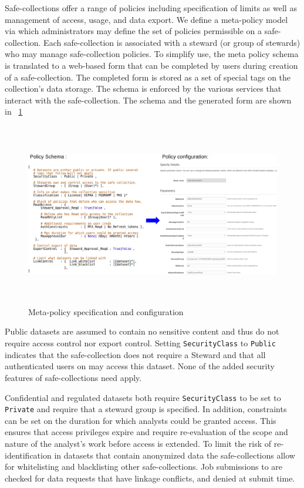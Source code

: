 Safe-collections offer a range of policies including specification of limits as well as management 
of access, usage, and data export. We define a meta-policy model via which administrators may define
the set of policies permissible on a safe-collection. Each safe-collection is associated with a steward
(or group of stewards) who may manage safe-collection policies. To simplify use, the meta policy schema 
is translated to a web-based form that can be completed by users during creation of a safe-collection. 
The completed form is stored as a set of special tags on the collection's data storage. The schema is enforced
by the various services that interact with the safe-collection. The schema and the generated form are shown in
\figurename~\ref{fig:schema}

\begin{figure}[ht]
  \center
  \includegraphics[width=\textwidth, height=8cm]{figures/meta-policy.png}
  \caption{Meta-policy specification and configuration}
  \vspace{-1.5em}
  \label{fig:schema}
\end{figure}

Public datasets are assumed to contain no sensitive content and thus do not require access control nor
export control. Setting \texttt{SecurityClass} to \texttt{Public} indicates that the safe-collection does
not require a Steward and that all authenticated users on \NAME may access this dataset. None of the added
security features of safe-collections need apply.

Confidential and regulated datasets both require \texttt{SecurityClass} to be set to \texttt{Private}
and require that a steward group is specified. In addition, constraints can be set on the duration
for which analysts could be granted access. This ensures that access privileges expire and require
re-evaluation of the scope and nature of the analyst's work before access is extended. To limit the risk of
re-identification in datasets that contain anonymized data the safe-collections allow for whitelisting and
blacklisting other safe-collections. Job submissions to \NAME are checked for data requests that have
linkage conflicts, and denied at submit time.


